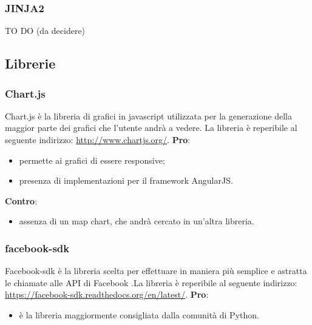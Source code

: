 		\subsubsection{JINJA2} %
		\label{ssub:jinja}
		TO DO (da decidere)


	\subsection{Librerie} %
	\label{sub:librerie}
		\subsubsection{Chart.js} %
		\label{ssub:chartsjs}
		Chart.js è la libreria di grafici in javascript utilizzata per la generazione della maggior parte dei grafici che l'utente andrà a vedere. La libreria è reperibile al seguente indirizzo: \url{http://www.chartjs.org/}. \newline
		\textbf{Pro}:
			\begin{itemize}
				\item permette ai grafici di essere responsive;
				\item presenza di implementazioni per il framework AngularJS.
			\end{itemize}
		\noindent
		\newline
		\textbf{Contro}:
			\begin{itemize}
				\item assenza di un map chart, che andrà cercato in un'altra libreria.
			\end{itemize}
			\noindent
		
		\subsubsection{facebook-sdk} %
		\label{ssub:facebook_sdk}
		Facebook-sdk è la libreria scelta per effettuare in maniera più semplice e astratta le chiamate alle API di Facebook .La libreria è reperibile al seguente indirizzo: \url{https://facebook-sdk.readthedocs.org/en/latest/}. \newline
		\textbf{Pro}:
			\begin{itemize}
				\item è la libreria maggiormente consigliata dalla comunità di Python.
			\end{itemize}
		\noindent
		\newline

